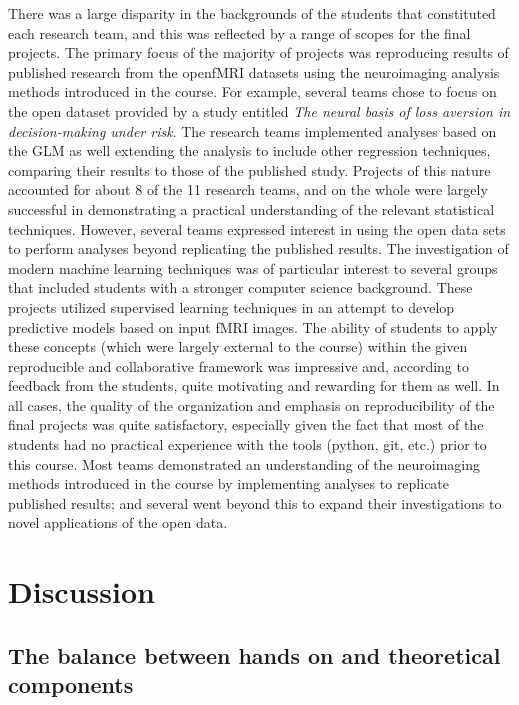 There was a large disparity in the backgrounds of the students that constituted 
each research team, and this was reflected by a range of scopes for the
final projects.
The primary focus of the majority of projects was reproducing results
of published research from the openfMRI datasets using the neuroimaging 
analysis methods introduced in the course.
For example, several teams chose to focus on the open dataset provided by a
study entitled \textit{The neural basis of loss aversion in decision-making
under risk}\cite{tom2007neutral}.
The research teams implemented analyses based on the GLM as well extending
the analysis to include other regression techniques, comparing their results
to those of the published study.
Projects of this nature accounted for about 8 of the 11 research teams, and
on the whole were largely successful in demonstrating a practical understanding
of the relevant statistical techniques.
However, several teams expressed interest in using the open data sets to 
perform analyses beyond replicating the published results.
The investigation of modern machine learning techniques was of particular 
interest to several groups that included students with a stronger computer
science background.
These projects utilized supervised learning techniques in an attempt to 
develop predictive models based on input fMRI images.
The ability of students to apply these concepts (which were largely external
to the course) within the given reproducible and collaborative 
framework was impressive and, according to feedback from the students, quite
motivating and rewarding for them as well.
In all cases, the quality of the organization and emphasis on reproducibility
of the final projects was quite satisfactory, especially given the fact that
most of the students had no practical experience with the tools (python, git,
etc.) prior to this course.
Most teams demonstrated an understanding of the neuroimaging methods introduced
in the course by implementing analyses to replicate published results; and 
several went beyond this to expand their investigations to novel applications
of the open data.


\section{Discussion}\label{discussion}

\subsection{The balance between hands on and theoretical components}

